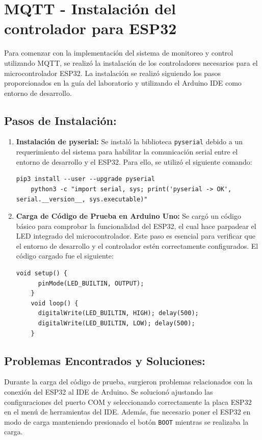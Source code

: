 \section{MQTT - Instalación del controlador para ESP32}

Para comenzar con la implementación del sistema de monitoreo y control utilizando MQTT, se realizó la instalación de los controladores necesarios para el microcontrolador ESP32. La instalación se realizó siguiendo los pasos proporcionados en la guía del laboratorio y utilizando el Arduino IDE como entorno de desarrollo.

\subsection{Pasos de Instalación:}
\begin{enumerate}
    \item \textbf{Instalación de pyserial:}
    Se instaló la biblioteca \texttt{pyserial} debido a un requerimiento del sistema para habilitar la comunicación serial entre el entorno de desarrollo y el ESP32. Para ello, se utilizó el siguiente comando:
    \begin{lstlisting}[style=bashstyle]
    pip3 install --user --upgrade pyserial
    python3 -c "import serial, sys; print('pyserial -> OK', serial.__version__, sys.executable)"
    \end{lstlisting}
    
    \item \textbf{Carga de Código de Prueba en Arduino Uno:}
    Se cargó un código básico para comprobar la funcionalidad del ESP32, el cual hace parpadear el LED integrado del microcontrolador. Este paso es esencial para verificar que el entorno de desarrollo y el controlador estén correctamente configurados. El código cargado fue el siguiente:
    \begin{lstlisting}[style=cppstyle]
    void setup() {
      pinMode(LED_BUILTIN, OUTPUT);
    }
    void loop() {
      digitalWrite(LED_BUILTIN, HIGH); delay(500);
      digitalWrite(LED_BUILTIN, LOW); delay(500);
    }
    \end{lstlisting}
\end{enumerate}

\subsection{Problemas Encontrados y Soluciones:}
Durante la carga del código de prueba, surgieron problemas relacionados con la conexión del ESP32 al IDE de Arduino. Se solucionó ajustando las configuraciones del puerto COM y seleccionando correctamente la placa ESP32 en el menú de herramientas del IDE. Además, fue necesario poner el ESP32 en modo de carga manteniendo presionado el botón \texttt{BOOT} mientras se realizaba la carga.

